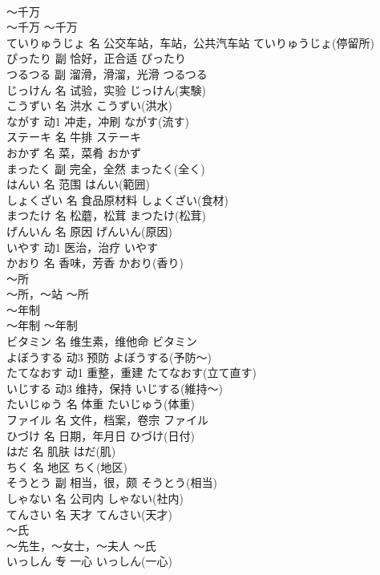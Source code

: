 \documentclass[8pt]{extreport}
\begin{document}
\begin{CJK}{UTF8}{min}
\\	～千万	
\\	～千万	～千万	
\\	ていりゅうじょ	名	公交车站，车站，公共汽车站	ていりゅうじょ(停留所)	
\\	ぴったり	副	恰好，正合适	ぴったり	
\\	つるつる	副	溜滑，滑溜，光滑	つるつる	
\\	じっけん	名	试验，实验	じっけん(実験)	
\\	こうずい	名	洪水	こうずい(洪水)	
\\	ながす	动1	冲走，冲刷	ながす(流す)	
\\	ステーキ	名	牛排	ステーキ	
\\	おかず	名	菜，菜肴	おかず	
\\	まったく	副	完全，全然	まったく(全く)	
\\	はんい	名	范围	はんい(範囲)	
\\	しょくざい	名	食品原材料	しょくざい(食材)	
\\	まつたけ	名	松蘑，松茸	まつたけ(松茸)	
\\	げんいん	名	原因	げんいん(原因)	
\\	いやす	动1	医治，治疗	いやす	
\\	かおり	名	香味，芳香	かおり(香り)	
\\	～所	
\\	～所，～站	～所	
\\	～年制	
\\	～年制	～年制	
\\	ビタミン	名	维生素，维他命	ビタミン	
\\	よぼうする	动3	预防	よぼうする(予防～)	
\\	たてなおす	动1	重整，重建	たてなおす(立て直す)	
\\	いじする	动3	维持，保持	いじする(維持～)	
\\	たいじゅう	名	体重	たいじゅう(体重)	
\\	ファイル	名	文件，档案，卷宗	ファイル	
\\	ひづけ	名	日期，年月日	ひづけ(日付)	
\\	はだ	名	肌肤	はだ(肌)	
\\	ちく	名	地区	ちく(地区)	
\\	そうとう	副	相当，很，颇	そうとう(相当)	
\\	しゃない	名	公司内	しゃない(社内)	
\\	てんさい	名	天才	てんさい(天才)	
\\	～氏	
\\	～先生，～女士，～夫人	～氏	
\\	いっしん	专	一心	いっしん(一心)	

\end{CJK}
\end{document}
